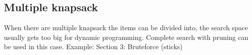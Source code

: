 \subsection{Multiple knapsack}
When there are multiple knapsack the items can be divided into, the search space usually gets too big for dynamic programming. Complete search with pruning can be used in this case.
Example: Section 3: Bruteforce (sticks)

